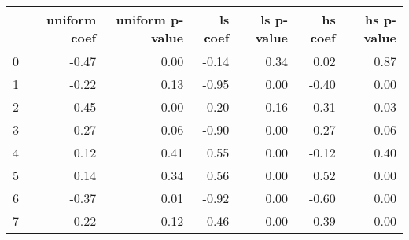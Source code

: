 \begin{tabular}{lrrrrrr}
\toprule
 & uniform coef & uniform p-value & ls coef & ls p-value & hs coef & hs p-value \\
\midrule
0 & -0.47 & 0.00 & -0.14 & 0.34 & 0.02 & 0.87 \\
1 & -0.22 & 0.13 & -0.95 & 0.00 & -0.40 & 0.00 \\
2 & 0.45 & 0.00 & 0.20 & 0.16 & -0.31 & 0.03 \\
3 & 0.27 & 0.06 & -0.90 & 0.00 & 0.27 & 0.06 \\
4 & 0.12 & 0.41 & 0.55 & 0.00 & -0.12 & 0.40 \\
5 & 0.14 & 0.34 & 0.56 & 0.00 & 0.52 & 0.00 \\
6 & -0.37 & 0.01 & -0.92 & 0.00 & -0.60 & 0.00 \\
7 & 0.22 & 0.12 & -0.46 & 0.00 & 0.39 & 0.00 \\
\bottomrule
\end{tabular}
